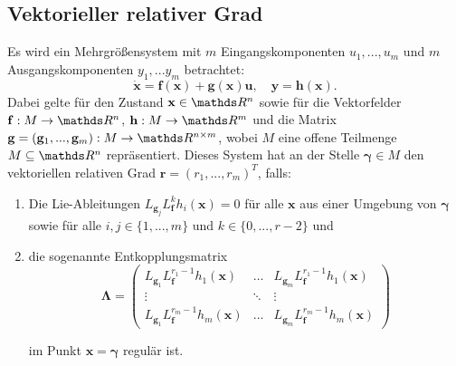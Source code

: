 \subsection{Vektorieller relativer Grad}
\label{sec:definition_relative_degree}
Es wird ein Mehrgrößensystem mit $m$ Eingangskomponenten $u_1, ..., u_m$ und $m$ Ausgangskomponenten $y_1, ... y_m$ betrachtet:
\begin{equation}
	\label{eq:state_space_vector_degree}
	\dot{\mathbf{x}} = \mathbf{f}(\mathbf{x}) + \mathbf{g}(\mathbf{x}) \mathbf{u}, \quad \mathbf{y} = \mathbf{h}(\mathbf{x}).
\end{equation}
Dabei gelte für den Zustand $\mathbf{x} \in \Reals^n$ sowie für die Vektorfelder $\mathbf{f}: M \rightarrow \Reals^n$, $\mathbf{h}: M \rightarrow \Reals^m$ und die Matrix $\mathbf{g} = (\mathbf{g}_1, ..., \mathbf{g}_m): M \rightarrow \Reals^{n \times m}$, wobei $M$ eine offene Teilmenge $M \subseteq \Reals^{n}$ repräsentiert. Dieses System hat an der Stelle $\boldsymbol{\gamma} \in M$ den vektoriellen relativen Grad $\mathbf{r} = (r_1, ..., r_m)^T$, falls:
\begin{enumerate}
	\item Die Lie-Ableitungen $L_{\mathbf{g}_j} L_{\mathbf{f}}^k h_i(\mathbf{x}) = 0$ für alle $\mathbf{x}$ aus einer Umgebung von $\boldsymbol{\gamma}$ sowie für alle $i,j \in \{1, ..., m\}$ und $k \in \{0, ..., r-2\}$ und
	\item die sogenannte Entkopplungsmatrix
		\begin{equation}
		\label{eq:decoupling_matrix}
		\boldsymbol{\Lambda} = 
		\left(\begin{matrix}
		L_{\mathbf{g}_1} L_{\mathbf{f}}^{r_1 -1} h_1(\mathbf{x}) & \hdots & L_{\mathbf{g}_m} L_{\mathbf{f}}^{r_1 -1} h_1(\mathbf{x}) \\
		\vdots & \ddots & \vdots \\
		L_{\mathbf{g}_1} L_{\mathbf{f}}^{r_m -1} h_m(\mathbf{x}) & \hdots & L_{\mathbf{g}_m} L_{\mathbf{f}}^{r_m -1} h_m(\mathbf{x})
		\end{matrix}\right) 
	\end{equation}
	
	im Punkt $\mathbf{x} = \boldsymbol{\gamma}$ regulär ist.
\end{enumerate}
\cite[S. 194]{NLRT_Roebenack}

